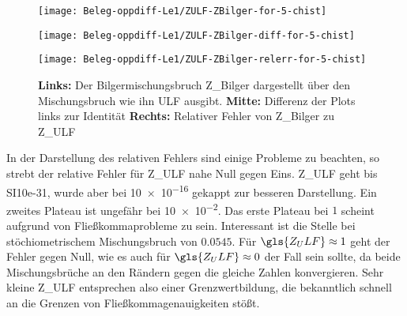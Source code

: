 \begin{figure}[H]
    \begin{minipage}{0.33\linewidth}\begin{center}
        \texttt{[image: Beleg-oppdiff-Le1/ZULF-ZBilger-for-5-chist]}
    \end{center}\end{minipage}\begin{minipage}{0.33\linewidth}\begin{center}
        \texttt{[image: Beleg-oppdiff-Le1/ZULF-ZBilger-diff-for-5-chist]}
    \end{center}\end{minipage}\begin{minipage}{0.33\linewidth}\begin{center}
        \texttt{[image: Beleg-oppdiff-Le1/ZULF-ZBilger-relerr-for-5-chist]}
    \end{center}\end{minipage}
    \caption{
        \textbf{Links:} Der Bilgermischungsbruch \gls{Z_Bilger} dargestellt über den Mischungsbruch wie ihn \gls{ULF} ausgibt.
        \textbf{Mitte:} Differenz der Plots links zur Identität
        \textbf{Rechts:} Relativer Fehler von \gls{Z_Bilger} zu \gls{Z_ULF}
    }
    \label{fig:zbilger-z}
\end{figure}

In der Darstellung des relativen Fehlers sind einige Probleme zu beachten, so strebt der relative Fehler für \gls{Z_ULF} nahe Null gegen Eins. \gls{Z_ULF} geht bis SI{10e-31}{}, wurde aber bei \SI{10e-16}{} gekappt zur besseren Darstellung. Ein zweites Plateau ist ungefähr bei \SI{10e-2}{}. Das erste Plateau bei $1$ scheint aufgrund von Fließkommaprobleme zu sein. Interessant ist die Stelle bei stöchiometrischem Mischungsbruch von $0.0545$. Für $\gls{Z_ULF}\approx 1$ geht der Fehler gegen Null, wie es auch für $\gls{Z_ULF}\approx 0$ der Fall sein sollte, da beide Mischungsbrüche an den Rändern gegen die gleiche Zahlen konvergieren. Sehr kleine \gls{Z_ULF} entsprechen also einer Grenzwertbildung, die bekanntlich schnell an die Grenzen von Fließkommagenauigkeiten stößt.

